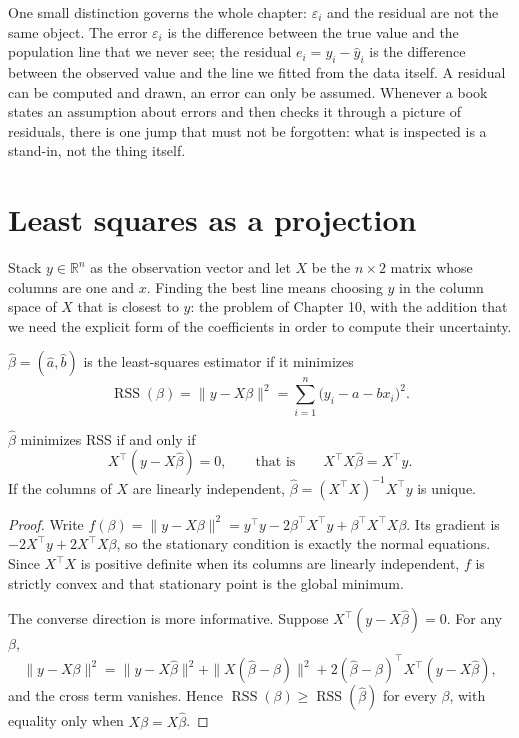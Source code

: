 One small distinction governs the whole chapter: $\varepsilon_i$ and the residual are not the
same object. The error $\varepsilon_i$ is the difference between the true value and the
population line that we never see; the residual $e_i=y_i-\hat y_i$ is the difference between
the observed value and the line we fitted from the data itself. A residual can be computed and
drawn, an error can only be assumed. Whenever a book states an assumption about errors and then
checks it through a picture of residuals, there is one jump that must not be forgotten: what is
inspected is a stand-in, not the thing itself.

\section{Least squares as a projection}

Stack $y\in\mathbb{R}^n$ as the observation vector and let $X$ be the $n\times2$ matrix whose
columns are one and $x$. Finding the best line means choosing $\hat y$ in the column space of
$X$ that is closest to $y$: the problem of Chapter 10, with the addition that we need the
explicit form of the coefficients in order to compute their uncertainty.

\begin{definisi}
$\hat\beta=(\hat a,\hat b)$ is the least-squares estimator if it minimizes
\[
\operatorname{RSS}(\beta)=\|y-X\beta\|^2=\sum_{i=1}^{n}\bigl(y_i-a-bx_i\bigr)^2 .
\]
\end{definisi}


\begin{teorema}
$\hat\beta$ minimizes RSS if and only if
\[
X^{\top}(y-X\hat\beta)=0 ,
\qquad\text{that is}\qquad X^{\top}X\hat\beta=X^{\top}y .
\]
If the columns of $X$ are linearly independent, $\hat\beta=(X^{\top}X)^{-1}X^{\top}y$ is
unique.
\end{teorema}

\begin{proof}[Proof]
Write $f(\beta)=\|y-X\beta\|^2=y^{\top}y-2\beta^{\top}X^{\top}y+\beta^{\top}X^{\top}X\beta$.
Its gradient is $-2X^{\top}y+2X^{\top}X\beta$, so the stationary condition is exactly the normal
equations. Since $X^{\top}X$ is positive definite when its columns are linearly independent,
$f$ is strictly convex and that stationary point is the global minimum.

The converse direction is more informative. Suppose $X^{\top}(y-X\hat\beta)=0$. For any
$\beta$,
\[
\|y-X\beta\|^2=\|y-X\hat\beta\|^2+\|X(\hat\beta-\beta)\|^2
+2(\hat\beta-\beta)^{\top}X^{\top}(y-X\hat\beta),
\]
and the cross term vanishes. Hence $\operatorname{RSS}(\beta)\ge\operatorname{RSS}(\hat\beta)$
for every $\beta$, with equality only when $X\beta=X\hat\beta$.
\end{proof}

